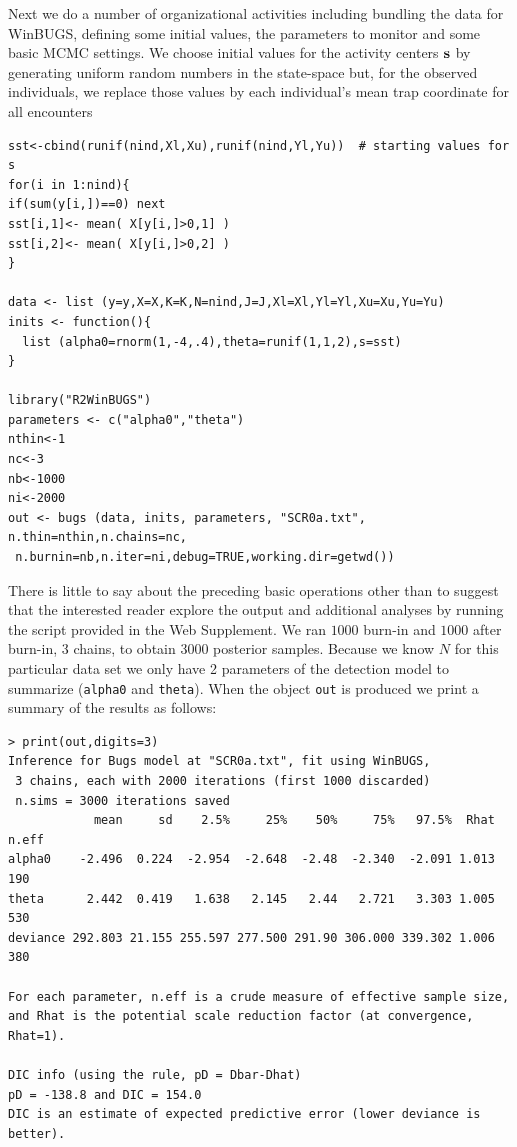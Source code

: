 Next we do a number of organizational activities including bundling the data for WinBUGS, defining some initial values, the parameters to monitor and some basic MCMC settings. 
We choose initial values for the activity centers ${\bf s}$ by generating uniform random numbers in the state-space but, for the observed individuals, we replace those values by each individual's mean trap coordinate for all encounters
\begin{verbatim}
sst<-cbind(runif(nind,Xl,Xu),runif(nind,Yl,Yu))  # starting values for s
for(i in 1:nind){
if(sum(y[i,])==0) next
sst[i,1]<- mean( X[y[i,]>0,1] )
sst[i,2]<- mean( X[y[i,]>0,2] )
}

data <- list (y=y,X=X,K=K,N=nind,J=J,Xl=Xl,Yl=Yl,Xu=Xu,Yu=Yu)
inits <- function(){
  list (alpha0=rnorm(1,-4,.4),theta=runif(1,1,2),s=sst)
}

library("R2WinBUGS")
parameters <- c("alpha0","theta")
nthin<-1
nc<-3
nb<-1000
ni<-2000
out <- bugs (data, inits, parameters, "SCR0a.txt", n.thin=nthin,n.chains=nc,
 n.burnin=nb,n.iter=ni,debug=TRUE,working.dir=getwd())
\end{verbatim}

There is little to say about the preceding basic operations other than
to suggest that the interested reader explore the output and
additional analyses by running the script provided in the Web
Supplement.  We ran $1000$ burn-in and $1000$ after burn-in, 3 chains,
to obtain 3000 posterior samples.  Because we know $N$ for this
particular data set we only have 2 parameters of the detection model
to summarize (\mbox{\tt alpha0} and \mbox{\tt theta}).  When the
object \mbox{\tt out} is produced we print a summary of the results as
follows:
\begin{verbatim}
> print(out,digits=3)
Inference for Bugs model at "SCR0a.txt", fit using WinBUGS,
 3 chains, each with 2000 iterations (first 1000 discarded)
 n.sims = 3000 iterations saved
            mean     sd    2.5%     25%    50%     75%   97.5%  Rhat n.eff
alpha0    -2.496  0.224  -2.954  -2.648  -2.48  -2.340  -2.091 1.013   190
theta      2.442  0.419   1.638   2.145   2.44   2.721   3.303 1.005   530
deviance 292.803 21.155 255.597 277.500 291.90 306.000 339.302 1.006   380

For each parameter, n.eff is a crude measure of effective sample size,
and Rhat is the potential scale reduction factor (at convergence, Rhat=1).

DIC info (using the rule, pD = Dbar-Dhat)
pD = -138.8 and DIC = 154.0
DIC is an estimate of expected predictive error (lower deviance is better).
\end{verbatim}

